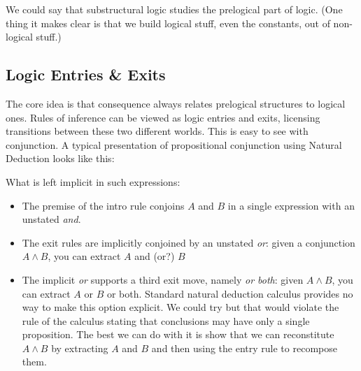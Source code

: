 \documentclass{article}
\begin{document}
We could say that substructural logic studies the prelogical part of
logic. (One thing it makes clear is that we build logical stuff, even
the constants, out of non-logical stuff.)

\subsection{Logic Entries \& Exits}

The core idea is that consequence always relates prelogical structures
to logical ones. Rules of inference can be viewed as logic entries and
exits, licensing transitions between these two different worlds. This
is easy to see with conjunction. A typical presentation of
propositional conjunction using Natural Deduction looks like this:


What is left implicit in such expressions:

\begin{itemize}
\item The premise of the intro rule conjoins \(A\) and \(B\) in a single expression
  with an unstated \textit{and}.
  \item The exit rules are implicitly conjoined by an unstated
    \textit{or}: given a conjunction \(A\land B\), you can extract
    \(A\) and (or?) \(B\)
  \item The implicit \textit{or} supports a third exit move, namely
    \textit{or both}: given \(A\land B\), you can extract \(A\) or
    \(B\) or both. Standard natural deduction calculus provides no way
    to make this option explicit. We could try%
but that would violate the rule of the calculus stating that
conclusions may have only a single proposition. The best we can do
with it is show that we can reconstitute \(A\land B\) by extracting
\(A\) and \(B\) and then using the entry rule to recompose them.
\end{itemize}
\end{document}
